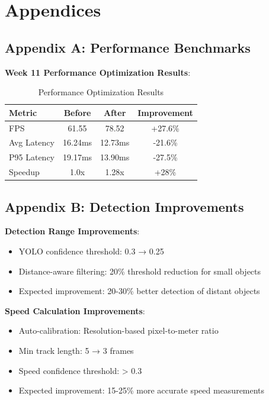 \documentclass[12pt,a4paper]{article}
\begin{document}


\newpage
\section*{Appendices}

\subsection*{Appendix A: Performance Benchmarks}

\textbf{Week 11 Performance Optimization Results}:

\begin{table}[H]
\centering
\begin{tabular}{|l|c|c|c|}
\hline
\textbf{Metric} & \textbf{Before} & \textbf{After} & \textbf{Improvement} \\
\hline
FPS & 61.55 & 78.52 & +27.6\% \\
Avg Latency & 16.24ms & 12.73ms & -21.6\% \\
P95 Latency & 19.17ms & 13.90ms & -27.5\% \\
Speedup & 1.0x & 1.28x & +28\% \\
\hline
\end{tabular}
\caption{Performance Optimization Results}
\end{table}

\subsection*{Appendix B: Detection Improvements}

\textbf{Detection Range Improvements}:
\begin{itemize}
    \item YOLO confidence threshold: 0.3 → 0.25
    \item Distance-aware filtering: 20\% threshold reduction for small objects
    \item Expected improvement: 20-30\% better detection of distant objects
\end{itemize}

\textbf{Speed Calculation Improvements}:
\begin{itemize}
    \item Auto-calibration: Resolution-based pixel-to-meter ratio
    \item Min track length: 5 → 3 frames
    \item Speed confidence threshold: > 0.3
    \item Expected improvement: 15-25\% more accurate speed measurements
\end{itemize}
\end{document}
